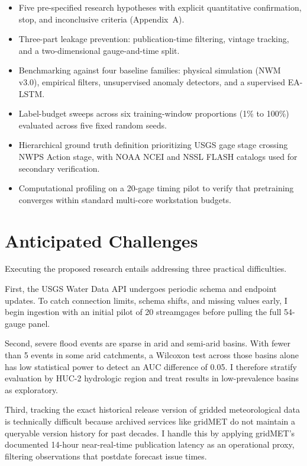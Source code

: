 \documentclass[12pt]{report}
\begin{document}
\begin{itemize}
  \item Five pre-specified research hypotheses with explicit quantitative confirmation, stop, and inconclusive criteria (Appendix~A).
  \item Three-part leakage prevention: publication-time filtering, vintage tracking, and a two-dimensional gauge-and-time split.
  \item Benchmarking against four baseline families: physical simulation (NWM v3.0), empirical filters, unsupervised anomaly detectors, and a supervised EA-LSTM.
  \item Label-budget sweeps across six training-window proportions (1\% to 100\%) evaluated across five fixed random seeds.
  \item Hierarchical ground truth definition prioritizing USGS gage stage crossing NWPS Action stage, with NOAA NCEI and NSSL FLASH catalogs used for secondary verification.
  \item Computational profiling on a 20-gage timing pilot to verify that pretraining converges within standard multi-core workstation budgets.
\end{itemize}

\section{Anticipated Challenges}

Executing the proposed research entails addressing three practical difficulties.

First, the USGS Water Data API undergoes periodic schema and endpoint updates. To catch connection limits, schema shifts, and missing values early, I begin ingestion with an initial pilot of 20 streamgages before pulling the full 54-gauge panel.

Second, severe flood events are sparse in arid and semi-arid basins. With fewer than 5 events in some arid catchments, a Wilcoxon test across those basins alone has low statistical power to detect an AUC difference of 0.05. I therefore stratify evaluation by HUC-2 hydrologic region and treat results in low-prevalence basins as exploratory.

Third, tracking the exact historical release version of gridded meteorological data is technically difficult because archived services like gridMET do not maintain a queryable version history for past decades. I handle this by applying gridMET's documented 14-hour near-real-time publication latency as an operational proxy, filtering observations that postdate forecast issue times.
\end{document}
